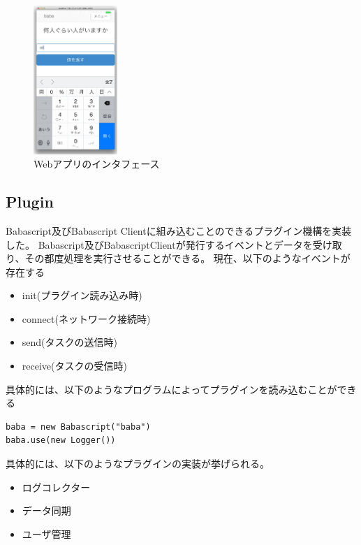 \begin{figure}[h]
  \centering
  \includegraphics[width=120px]{./images/interface.png}
  \caption{Webアプリのインタフェース}
  \label{webapp-interface}
\end{figure}

\subsection{Plugin}\label{plugin}

Babascript及びBabascript
Clientに組み込むことのできるプラグイン機構を実装した。
Babascript及びBabascriptClientが発行するイベントとデータを受け取り、その都度処理を実行させることができる。
現在、以下のようなイベントが存在する

\begin{itemize}
\itemsep1pt\parskip0pt
\item
  init(プラグイン読み込み時)
\item
  connect(ネットワーク接続時)
\item
  send(タスクの送信時)
\item
  receive(タスクの受信時)
\end{itemize}

具体的には、以下のようなプログラムによってプラグインを読み込むことができる

\begin{verbatim}
baba = new Babascript("baba")
baba.use(new Logger())
\end{verbatim}

具体的には、以下のようなプラグインの実装が挙げられる。

\begin{itemize}
\itemsep1pt\parskip0pt
\item
  ログコレクター
\item
  データ同期
\item
  ユーザ管理
\end{itemize}

